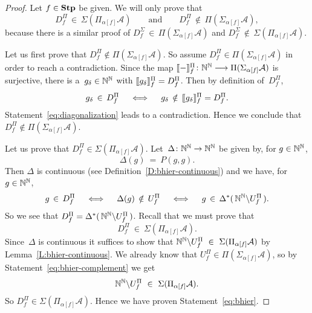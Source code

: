\documentclass[main.tex]{subfiles}
\begin{document}
\begin{proof}
Let $f\in\mathbf{Stp}$ be given.
We will only prove 
that
\begin{equation}
\label{eq:bhier}
D^\Pi_f \,\in\, \Sigma(\Pi_{\alpha[f]} \mathcal{A})
\qquad\text{and}\qquad
D^\Pi_f \,\notin\, \Pi(\Sigma_{\alpha[f]} \mathcal{A}),
\end{equation}
because there is a similar proof of
$D^\Sigma_f \,\in\, \Pi(\Sigma_{\alpha[f]} \mathcal{A})$
and
$D^\Sigma_f \,\notin\, \Sigma(\Pi_{\alpha[f]} \mathcal{A})$.

Let us first prove that 
$D^\Pi_f\notin  \Pi(\Sigma_{\alpha[f]}\mathcal{A})$.
So assume 
$D^\Pi_f\in \Pi(\Sigma_{\alpha[f]}\mathcal{A})$
in order to reach a contradiction.
Since the map $\decode{-}^\Pi_f\colon \N^\N \longrightarrow \Pi(\Sigma_{\alpha[f]}\mathcal{A})$
is surjective,
there is a~$g_\delta \in \mathbb{N}^{\mathbb{N}}$
with $\decode{g_\delta}^\Pi_f = D^\Pi_f$.
Then
by definition of~$D^\Pi_f$,
\begin{equation}
\label{eq:diagonalization}
g_\delta \,\in\, D^\Pi_f
\quad\iff\quad
g_\delta \,\notin\, \decode{g_\delta}^\Pi_f = D^\Pi_f.
\end{equation}
Statement~\eqref{eq:diagonalization}
leads to a contradiction.
Hence we conclude that $D^\Pi_f\notin \Pi(\Sigma_{\alpha[f]}\mathcal{A})$.

Let us prove that $D^\Pi_f \in \Sigma (\Pi_{\alpha[f]}\mathcal{A})$.
Let~$\Delta\colon \mathbb{N}^{\mathbb{N}} \rightarrow \mathbb{N}^{\mathbb{N}}$
be given by, for $g\in \mathbb{N}^{\mathbb{N}}$,
\begin{equation*}
\Delta(g) \ =\  P(g,g).
\end{equation*}
Then $\Delta$ is continuous
(see Definition~\ref{D:bhier-continuous})
and we have, for $g\in \mathbb{N}^{\mathbb{N}}$,
\begin{equation*}
g\,\in\, D^\Pi_f 
\quad\iff\quad
\Delta(g) \,\notin\, U^\Pi_f
\quad\iff\quad
g\,\in\,\Delta^*(\,\mathbb{N}^{\mathbb{N}} \backslash U^\Pi_f \,).
\end{equation*}
So we see that $D^\Pi_f = \Delta^*(\,\mathbb{N}^{\mathbb{N}}\backslash U_f^\Pi\,)$.
Recall that we must prove that
\begin{equation*}
D^\Pi_f \ \in\  \Sigma (\Pi_{\alpha[f]}\mathcal{A}).
\end{equation*}
Since~$\Delta$
is continuous
it suffices to show that 
$\mathbb{N}^{\mathbb{N}}\backslash U_f^\Pi \ \in\  \Sigma (\Pi_{\alpha[f]}\mathcal{A})$
by Lemma~\ref{L:bhier-continuous}.
We already know that $U^\Pi_f \in \Pi(\Sigma_{\alpha[f]} \mathcal{A})$,
so 
by Statement~\eqref{eq:bhier-complement}
we get
\begin{equation*}
\N^\N\backslash U^\Pi_f \ \in\  \Sigma(\Pi_{\alpha[f]} \mathcal{A}).
\end{equation*}
So
$D^\Pi_f \in \Sigma (\Pi_{\alpha[f]}\mathcal{A})$.
Hence we have proven Statement~\eqref{eq:bhier}.
\end{proof}
\end{document}
